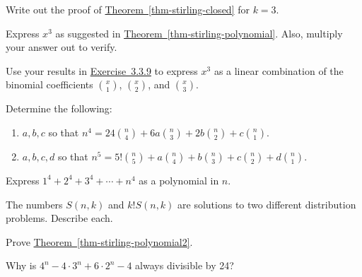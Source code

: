 \documentclass[10pt,]{book}
\theoremstyle{plain}
\theoremstyle{definition}
\theoremstyle{definition}
\theoremstyle{definition}
\theoremstyle{definition}
\numberwithin{equation}{chapter}
\begin{document}
\begin{divisionexercise}{8}\hypertarget{exercise-107}{}
\hypertarget{p-1204}{}%
Write out the proof of \hyperref[thm-stirling-closed]{Theorem~\ref{thm-stirling-closed}} for \(k=3\).%
\end{divisionexercise}%
\begin{divisionexercise}{9}\hypertarget{ex-stirling-cubic}{}
\hypertarget{p-1205}{}%
Express \(x^3\) as suggested in \hyperref[thm-stirling-polynomial]{Theorem~\ref{thm-stirling-polynomial}}.  Also, multiply your answer out to verify.%
\end{divisionexercise}%
\begin{divisionexercise}{10}\hypertarget{exercise-109}{}
\hypertarget{p-1206}{}%
Use your results in \hyperlink{ex-stirling-cubic}{Exercise~3.3.9} to express \(x^3\) as a linear combination of the binomial coefficients \(\binom{x}{1}\), \(\binom{x}{2}\), and \(\binom{x}{3}\).%
\end{divisionexercise}%
\begin{divisionexercise}{11}\hypertarget{exercise-110}{}
\hypertarget{p-1207}{}%
Determine the following: \leavevmode%
\begin{enumerate}[label=(\alph*)]
\item\hypertarget{li-223}{}\hypertarget{p-1208}{}%
\(a, b, c\) so that \(n^4 = 24\binom{n}{4} + 6a\binom{n}{3}+2b\binom{n}{2} + c \binom{n}{1}\).%
\item\hypertarget{li-224}{}\hypertarget{p-1209}{}%
\(a, b, c, d\) so that \(n^5 = 5!\binom{n}{5} + a\binom{n}{4} + b\binom{n}{3} + c \binom{n}{2} + d \binom{n}{1}\).%
\end{enumerate}
%
\end{divisionexercise}%
\begin{divisionexercise}{12}\hypertarget{exercise-111}{}
\hypertarget{p-1210}{}%
Express \(1^4 + 2^4 + 3^4 + \cdots + n^4\) as a polynomial in \(n\).%
\end{divisionexercise}%
\begin{divisionexercise}{13}\hypertarget{exercise-112}{}
\hypertarget{p-1211}{}%
The numbers \(S(n,k)\) and \(k!S(n,k)\) are solutions to two different distribution problems.  Describe each.%
\end{divisionexercise}%
\begin{divisionexercise}{14}\hypertarget{exercise-113}{}
\hypertarget{p-1212}{}%
Prove \hyperref[thm-stirling-polynomial2]{Theorem~\ref{thm-stirling-polynomial2}}.%
\end{divisionexercise}%
\begin{divisionexercise}{15}\hypertarget{exercise-114}{}
\hypertarget{p-1213}{}%
Why is \(4^n - 4\cdot 3^n + 6\cdot 2^n - 4\) always divisible by 24?%
\end{divisionexercise}%
\typeout{************************************************}
\typeout{************************************************}
\end{document}
